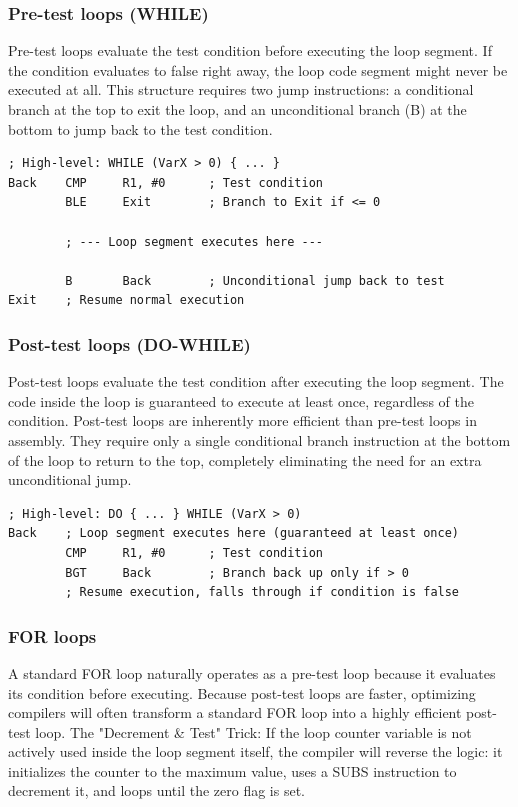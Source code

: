 \documentclass[../comorg-part1.tex]{subfiles}
\begin{document}
\subsubsection{Pre-test loops (WHILE)}
Pre-test loops evaluate the test condition before executing the loop segment.\newline
If the condition evaluates to false right away, the loop code segment might never be executed at all.\newline
This structure requires two jump instructions: a conditional branch at the top to exit the loop, and an unconditional branch (B) at the bottom to jump back to the test condition.
\begin{lstlisting}[language=ARM, title={Pre-test Loop: WHILE Implementation}, keepspaces=true]
; High-level: WHILE (VarX > 0) { ... }
Back    CMP     R1, #0      ; Test condition
        BLE     Exit        ; Branch to Exit if <= 0
        
        ; --- Loop segment executes here ---
        
        B       Back        ; Unconditional jump back to test
Exit    ; Resume normal execution
\end{lstlisting}

\subsubsection{Post-test loops (DO-WHILE)}
Post-test loops evaluate the test condition after executing the loop segment.\newline
The code inside the loop is guaranteed to execute at least once, regardless of the condition.\newline
Post-test loops are inherently more efficient than pre-test loops in assembly.
They require only a single conditional branch instruction at the bottom of the loop to return to the top, completely eliminating the need for an extra unconditional jump.
\begin{lstlisting}[language=ARM, title={Post-test Loop: DO-WHILE Implementation}, keepspaces=true]
; High-level: DO { ... } WHILE (VarX > 0)
Back    ; Loop segment executes here (guaranteed at least once)
        CMP     R1, #0      ; Test condition
        BGT     Back        ; Branch back up only if > 0
        ; Resume execution, falls through if condition is false
\end{lstlisting}

\subsubsection{FOR loops}
A standard FOR loop naturally operates as a pre-test loop because it evaluates its condition before executing.\newline
Because post-test loops are faster, optimizing compilers will often transform a standard FOR loop into a highly efficient post-test loop.\newline
The "Decrement \& Test" Trick: If the loop counter variable is not actively used inside the loop segment itself, the compiler will reverse the logic: it initializes the counter to the maximum value, uses a SUBS instruction to decrement it, and loops until the zero flag is set.
\end{document}
